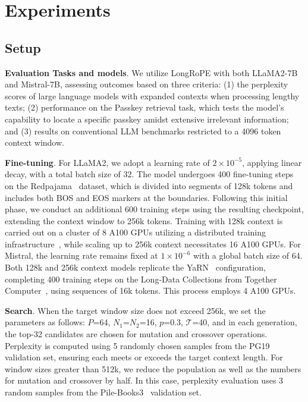  \section{Experiments}

\subsection{Setup}
\textbf{Evaluation Tasks and models}. We utilize LongRoPE with both LLaMA2-7B and Mistral-7B, assessing outcomes based on three criteria: (1) the perplexity scores of large language models with expanded contexts when processing lengthy texts; (2) performance on the Passkey retrieval task, which tests the model's capability to locate a specific passkey amidst extensive irrelevant information; and (3) results on conventional LLM benchmarks restricted to a 4096 token context window.

\textbf{Fine-tuning}. For LLaMA2, we adopt a learning rate of $2 \times 10^{-5}$, applying linear decay, with a total batch size of 32. The model undergoes 400 fine-tuning steps on the Redpajama~\cite{redpajama} dataset, which is divided into segments of 128k tokens and includes both BOS and EOS markers at the boundaries. Following this initial phase, we conduct an additional 600 training steps using the resulting checkpoint, extending the context window to 256k tokens. Training with 128k context is carried out on a cluster of 8 A100 GPUs utilizing a distributed training infrastructure~\cite{cube}, while scaling up to 256k context necessitates 16 A100 GPUs. For Mistral, the learning rate remains fixed at $1 \times 10^{-6}$ with a global batch size of 64. Both 128k and 256k context models replicate the YaRN~\cite{yarn} configuration, completing 400 training steps on the Long-Data Collections from Together Computer~\cite{mistraldata}, using sequences of 16k tokens. This process employs 4 A100 GPUs.

\textbf{Search}. When the target window size does not exceed 256k, we set the parameters as follows: $P$=64, $N_1$=$N_2$=16, $p$=0.3, $\mathcal{T}$=40, and in each generation, the top-32 candidates are chosen for mutation and crossover operations. Perplexity is computed using 5 randomly chosen samples from the PG19 validation set, ensuring each meets or exceeds the target context length. For window sizes greater than 512k, we reduce the population as well as the numbers for mutation and crossover by half. In this case, perplexity evaluation uses 3 random samples from the Pile-Books3~\cite{pile} validation set.

